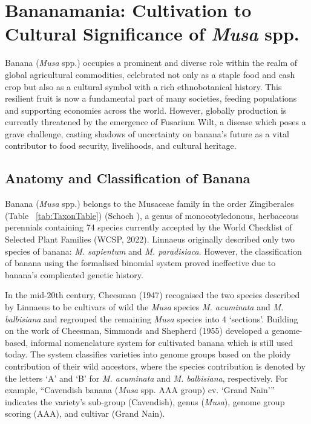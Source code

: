 \section {Bananamania: Cultivation to Cultural Significance of \textit{Musa} spp.}

Banana (\textit{Musa} spp.) occupies a prominent and diverse role within the realm of global agricultural commodities, celebrated not only as a staple food and cash crop but also as a cultural symbol with a rich ethnobotanical history. This resilient fruit is now a fundamental part of many societies, feeding populations and supporting economies across the world. However, globally production is currently threatened by the emergence of Fusarium Wilt, a disease which poses a grave challenge, casting shadows of uncertainty on banana's future as a vital contributor to food security, livelihoods, and cultural heritage.

\subsection{Anatomy and Classification of Banana}  

Banana (\textit{Musa} spp.) belongs to the Musaceae family in the order Zingiberales (Table ~\ref{tab:TaxonTable}) (Schoch ), a genus of monocotyledonous, herbaceous perennials containing 74 species currently accepted by the World Checklist of Selected Plant Families  (WCSP, 2022). Linnaeus originally described only two species of banana: \textit{M. sapientum }and \textit{M. paradisiaca}. However, the classification of banana using the formalised binomial system proved ineffective due to banana’s complicated genetic history.



In the mid-20th century, Cheesman (1947) recognised the two species described by Linnaeus to be cultivars of wild the \textit{Musa} species \textit{M. acuminata }and \textit{M. balbisiana} and regrouped the remaining \textit{Musa} species into 4 ‘sections’. Building on the work of Cheesman, Simmonds and Shepherd (1955) developed a genome-based, informal nomenclature system for cultivated banana which is still used today. The system classifies varieties into genome groups based on the ploidy contribution of their wild ancestors, where the species contribution is denoted by the letters ‘A’ and ‘B’ for \textit{M. acuminata} and \textit{M. balbisiana}, respectively. For example, “Cavendish banana (\textit{Musa } spp. AAA group) cv. ‘Grand Nain’” indicates the variety’s sub-group (Cavendish), genus (\textit{Musa}), genome group scoring (AAA), and cultivar (Grand Nain).

